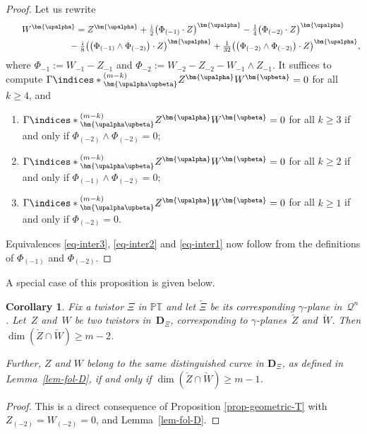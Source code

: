 \documentclass[10pt,a4paper]{amsart}
\numberwithin{equation}{section}
\newtheorem{Corollary}[Theorem]{Corollary}
\newcommand{\mbf} [1]{\mathbf{#1}}
\newcommand{\mc} [1]{\mathcal{#1}}
\newcommand{\ii} {\mathrm{i}}
\newcommand{\ind} {\indices}
\newcommand{\PT} {\mathbb{PT}}
\begin{document}
\begin{proof}Let us rewrite
\begin{gather*}
W^{\bm{\upalpha}} = Z^{\bm{\upalpha}} + \tfrac{\ii}{2} \big( \Phi_{(-1)} \cdot Z \big)^{\bm{\upalpha}} - \tfrac{1}{4} \big( \Phi_{(-2)} \cdot Z \big)^{\bm{\upalpha}} \\
\hphantom{W^{\bm{\upalpha}} =}{} - \tfrac{\ii}{8} \big( \big( \Phi_{(-1)} \wedge \Phi_{(-2)} \big) \cdot Z \big)^{\bm{\upalpha}} + \tfrac{1}{32} \big( \big( \Phi_{(-2)} \wedge \Phi_{(-2)} \big) \cdot Z \big)^{\bm{\upalpha}} ,
\end{gather*}
where $\Phi_{-1} := W_{-1} - Z_{-1}$ and $\Phi_{-2} := W_{-2} - Z_{-2} - W_{-1} \wedge Z_{-1}$. It suf\/f\/ices to compute $\Gamma \ind*{^{(m-k)}_{\bm{\upalpha \upbeta}}} Z^{\bm{\upalpha}} W^{\bm{\upbeta}} = 0$ for all $k \geq 4$, and
\begin{enumerate}\itemsep=0pt
\item[1)] $\Gamma \ind*{^{(m-k)}_{\bm{\upalpha \upbeta}}} Z^{\bm{\upalpha}} W^{\bm{\upbeta}} = 0$ for all $k \geq 3$ if and only if $\Phi_{(-2)} \wedge \Phi_{(-2)} = 0$;
\item[2)] $\Gamma \ind*{^{(m-k)}_{\bm{\upalpha \upbeta}}} Z^{\bm{\upalpha}} W^{\bm{\upbeta}} = 0$ for all $k \geq 2$ if and only if $\Phi_{(-1)} \wedge \Phi_{(-2)} = 0$;
\item[3)] $\Gamma \ind*{^{(m-k)}_{\bm{\upalpha \upbeta}}} Z^{\bm{\upalpha}} W^{\bm{\upbeta}} = 0$ for all $k \geq 1$ if and only if $\Phi_{(-2)}= 0$.
\end{enumerate}
Equivalences \eqref{eq-inter3}, \eqref{eq-inter2} and \eqref{eq-inter1} now follow from the def\/initions of $\Phi_{(-1)}$ and $\Phi_{(-2)}$.
\end{proof}

A special case of this proposition is given below.
\begin{Corollary}\label{cor-D-geom}
Fix a twistor $\Xi$ in $\PT$ and let $\check{\Xi }$ be its corresponding $\gamma$-plane in~$\mc{Q}^n$. Let~$Z$ and~$W$ be two twistors in~$\mbf{D}_\Xi$, corresponding to $\gamma$-planes~$\check{Z}$ and~$\check{W}$. Then $\dim ( \check{Z} \cap \check{W} ) \geq m-2$.

Further, $Z$ and $W$ belong to the same distinguished curve in $\mbf{D}_\Xi$, as defined in Lemma~{\rm \ref{lem-fol-D}}, if and only if $\dim(\check{Z} \cap \check{W}) \geq m-1$.
\end{Corollary}

\begin{proof}
This is a direct consequence of Proposition \ref{prop-geometric-T} with $Z_{(-2)} = W_{(-2)} = 0$, and Lem\-ma~\ref{lem-fol-D}.
\end{proof}
\end{document}
